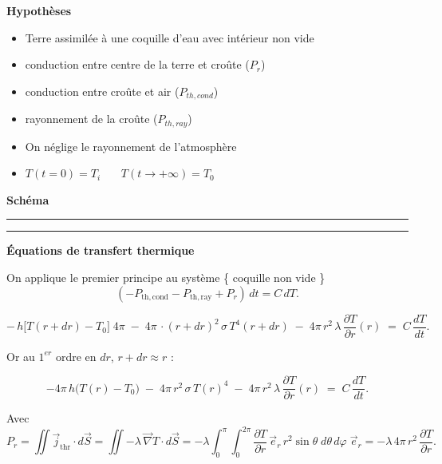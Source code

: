 \documentclass[a4paper,12pt]{article}
\begin{document}
\textbf{Hypothèses}
\begin{itemize}
    \item Terre assimilée à une coquille d'eau avec intérieur non vide 
    \item  conduction entre centre de la terre et croûte (\(P_r\))
    \item  conduction entre croûte et air (\(P_{th,cond}\))
    \item  rayonnement de la croûte (\(P_{th,ray}\))
    \item On néglige le rayonnement de l'atmosphère
    \item $T(t=0) = T_i$ \ \ \
$T(t \to +\infty) = T_0$
     
\end{itemize}

\vspace{0.5cm}
\textbf{Schéma}
\\
\noindent\textcolor{gray}{\rule{\linewidth}{0.4pt}}

    
\begin{center}
  
\end{center}
\noindent\textcolor{gray}{\rule{\linewidth}{0.4pt}}

\textbf{Équations de transfert thermique}

On applique le premier principe au système \{ coquille non vide  \}
\[
(-P_{\mathrm{th,cond}} - P_{\mathrm{th,ray}} + P_r)\,dt = C\,dT.
\]

\[
-\,h\bigl[T(r+dr)-T_0\bigr]\;4\pi
\;-\;4\pi\,\cdot (r+dr)^2\,\sigma\,T^4(r+dr)
\;-\;4\pi\,r^2\,\lambda\,\frac{\partial T}{\partial r}(r)
\;=\;C\,\frac{dT}{dt}.
\]

\medskip

Or au \(1^{er}\) ordre en \(dr\), \(r+dr\approx r\) :

\[
-4\pi\,h\bigl(T(r)-T_0\bigr)
\;-\;4\pi\,r^2\,\sigma\,T(r)^4
\;-\;4\pi\,r^2\,\lambda\,\frac{\partial T}{\partial r}(r)
\;=\;C\,\frac{dT}{dt}.
\]

\medskip

Avec
\[
P_{r}
= \iint\vec j_{\mathrm{thr}}\cdot d\vec S
= \iint -\lambda\,\vec{ \nabla } T\cdot d\vec S
= -\lambda
  \int_{0}^{\pi}\!\!\int_{0}^{2\pi}
    \frac{\partial T}{\partial r}\,\vec e_{r}\,
    r^2\sin\theta\;d\theta\,d\varphi\;\vec e_{r}
= -\lambda\,4\pi\,r^2\,\frac{\partial T}{\partial r}.
\]
\end{document}

